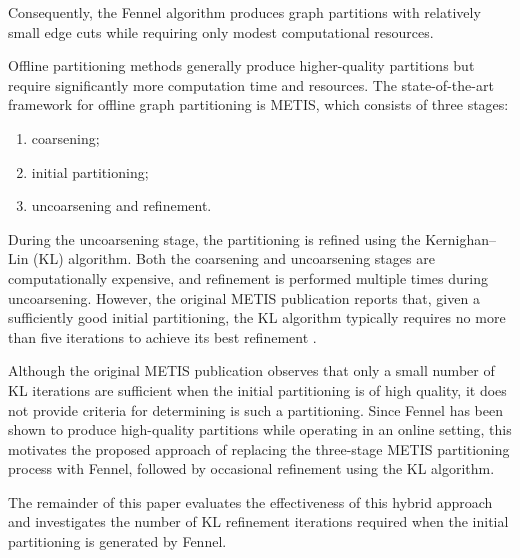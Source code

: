 Consequently, the Fennel algorithm produces graph partitions with relatively small edge cuts while requiring only modest computational resources.

Offline partitioning methods generally produce higher-quality partitions but require significantly more computation time and resources. The state-of-the-art framework for offline graph partitioning is METIS, which consists of three stages:

\begin{enumerate}
    \item coarsening;
    \item initial partitioning;
    \item uncoarsening and refinement.
\end{enumerate}

During the uncoarsening stage, the partitioning is refined using the Kernighan--Lin (KL) algorithm. Both the coarsening and uncoarsening stages are computationally expensive, and refinement is performed multiple times during uncoarsening. However, the original METIS publication reports that, given a sufficiently good initial partitioning, the KL algorithm typically requires no more than five iterations to achieve its best refinement \cite{MetisOG}.

Although the original METIS publication observes that only a small number of KL iterations are sufficient when the initial partitioning is of high quality, it does not provide criteria for determining is such a partitioning. Since Fennel has been shown to produce high-quality partitions while operating in an online setting, this motivates the proposed approach of replacing the three-stage METIS partitioning process with Fennel, followed by occasional refinement using the KL algorithm.

The remainder of this paper evaluates the effectiveness of this hybrid approach and investigates the number of KL refinement iterations required when the initial partitioning is generated by Fennel.
